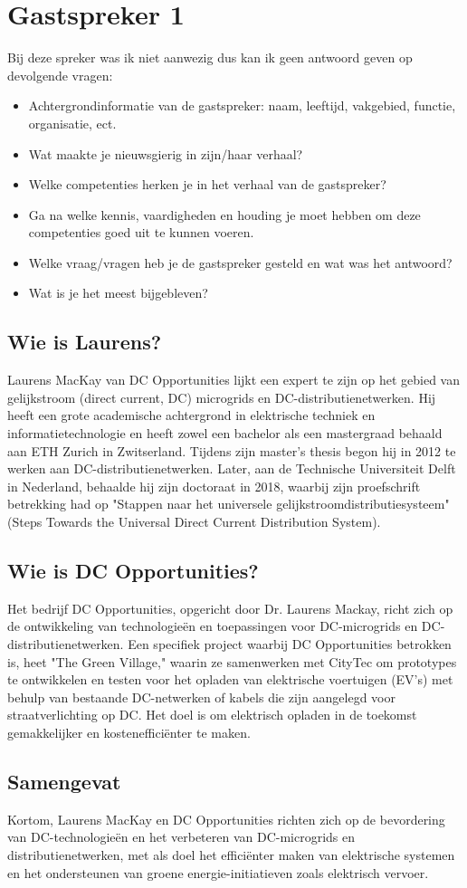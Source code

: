 \section{Gastspreker 1}
Bij deze spreker was ik niet aanwezig dus kan ik geen antwoord geven op devolgende vragen:
\begin{itemize}
    \item Achtergrondinformatie van de gastspreker: naam, leeftijd, vakgebied, functie, organisatie, ect.
    \item Wat maakte je nieuwsgierig in zijn/haar verhaal?
    \item Welke competenties herken je in het verhaal van de gastspreker?
    \item Ga na welke kennis, vaardigheden en houding je moet hebben om deze competenties goed uit te kunnen voeren.
    \item Welke vraag/vragen heb je de gastspreker gesteld en wat was het antwoord?
    \item Wat is je het meest bijgebleven?
\end{itemize}
\subsection{Wie is Laurens?}
Laurens MacKay van DC Opportunities lijkt een expert te zijn op het gebied van gelijkstroom (direct current, DC) microgrids en DC-distributienetwerken. Hij heeft een grote academische achtergrond in elektrische techniek en informatietechnologie en heeft zowel een bachelor als een mastergraad behaald aan ETH Zurich in Zwitserland. Tijdens zijn master's thesis begon hij in 2012 te werken aan DC-distributienetwerken. Later, aan de Technische Universiteit Delft in Nederland, behaalde hij zijn doctoraat in 2018, waarbij zijn proefschrift betrekking had op "Stappen naar het universele gelijkstroomdistributiesysteem" (Steps Towards the Universal Direct Current Distribution System).\cite{LaurensLINKEDIN}
\subsection{Wie is DC Opportunities?}
Het bedrijf DC Opportunities, opgericht door Dr. Laurens Mackay, richt zich op de ontwikkeling van technologieën en toepassingen voor DC-microgrids en DC-distributienetwerken. Een specifiek project waarbij DC Opportunities betrokken is, heet "The Green Village," waarin ze samenwerken met CityTec om prototypes te ontwikkelen en testen voor het opladen van elektrische voertuigen (EV's) met behulp van bestaande DC-netwerken of kabels die zijn aangelegd voor straatverlichting op DC. Het doel is om elektrisch opladen in de toekomst gemakkelijker en kostenefficiënter te maken. \cite{DCSITE} \cite{DCLINKEDIN} \cite{Innovation_Quarter}
\subsection{Samengevat}
Kortom, Laurens MacKay en DC Opportunities richten zich op de bevordering van DC-technologieën en het verbeteren van DC-microgrids en distributienetwerken, met als doel het efficiënter maken van elektrische systemen en het ondersteunen van groene energie-initiatieven zoals elektrisch vervoer.